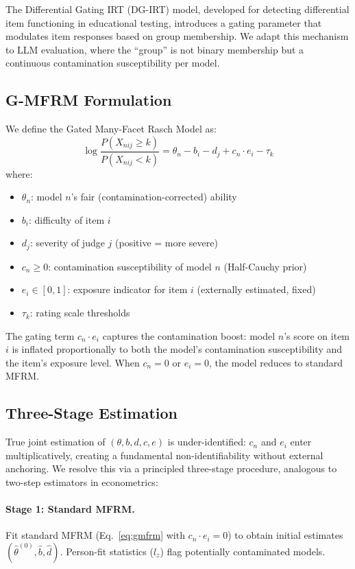\documentclass[11pt]{article}
\newcommand{\cn}{c_n}
\newcommand{\ei}{e_i}
\newcommand{\severity}{d_j}
\begin{document}
The Differential Gating IRT (DG-IRT) model, developed for detecting differential item functioning in educational testing, introduces a gating parameter that modulates item responses based on group membership.
We adapt this mechanism to LLM evaluation, where the ``group'' is not binary membership but a continuous contamination susceptibility per model.

\subsection{G-MFRM Formulation}

We define the Gated Many-Facet Rasch Model as:
\begin{equation}
    \log\frac{P(X_{nij} \geq k)}{P(X_{nij} < k)} = \theta_n - b_i - \severity + \cn \cdot \ei - \tau_k
    \label{eq:gmfrm}
\end{equation}
where:
\begin{itemize}
    \item $\theta_n$: model $n$'s fair (contamination-corrected) ability
    \item $b_i$: difficulty of item $i$
    \item $\severity$: severity of judge $j$ (positive = more severe)
    \item $\cn \geq 0$: contamination susceptibility of model $n$ (Half-Cauchy prior)
    \item $\ei \in [0,1]$: exposure indicator for item $i$ (externally estimated, fixed)
    \item $\tau_k$: rating scale thresholds
\end{itemize}

The gating term $\cn \cdot \ei$ captures the contamination boost: model $n$'s score on item $i$ is inflated proportionally to both the model's contamination susceptibility and the item's exposure level.
When $\cn = 0$ or $\ei = 0$, the model reduces to standard MFRM.

\subsection{Three-Stage Estimation}

True joint estimation of $(\theta, b, d, c, e)$ is under-identified: $\cn$ and $\ei$ enter multiplicatively, creating a fundamental non-identifiability without external anchoring.
We resolve this via a principled three-stage procedure, analogous to two-step estimators in econometrics:

\paragraph{Stage 1: Standard MFRM.}
Fit standard MFRM (Eq.~\ref{eq:gmfrm} with $\cn \cdot \ei = 0$) to obtain initial estimates $(\hat{\theta}^{(0)}, \hat{b}, \hat{d})$.
Person-fit statistics ($l_z$) flag potentially contaminated models.
\end{document}
